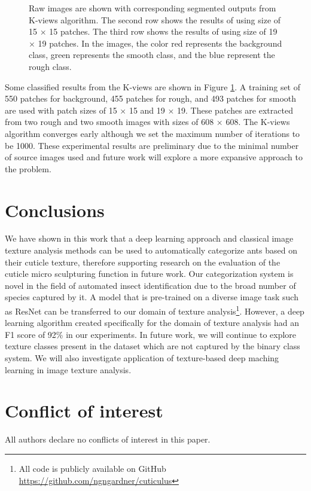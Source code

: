 \documentclass{aci}
\numberwithin{equation}{section}
\begin{document}
\begin{figure}
\begin{subfigure}{\segmentedsubwidth}
    \end{subfigure}
    \caption{Raw images are shown with corresponding segmented outputs from
        K-views algorithm. The second row shows the results of using size of 15
        $\times$ 15 patches. The third row shows the results of using size of 19
        $\times$ 19 patches. In the images, the color red represents the
        background class, green represents the smooth class, and the blue
        represent the rough class.}
    \label{fig:kviews_segmented}
\end{figure}

\FloatBarrier Some classified results from the K-views are shown in Figure
\ref{fig:kviews_segmented}. A training set of 550 patches for background, 455
patches for rough, and 493 patches for smooth are used with patch sizes of 15
$\times$ 15 and 19 $\times$ 19. These patches are extracted from two rough and
two smooth images with sizes of 608 $\times$ 608. The K-views algorithm
converges early although we set the maximum number of iterations to be 1000.
These experimental results are preliminary due to the minimal number of source
images used and future work will explore a more expansive approach to the
problem.

\section{Conclusions}
We have shown in this work that a deep learning approach and classical image
texture analysis methods can be used to automatically categorize ants based on
their cuticle texture, therefore supporting research on the evaluation of the
cuticle micro sculpturing function in future work. Our categorization system is
novel in the field of automated insect identification due to the broad number of
species captured by it. A model that is pre-trained on a diverse image task such
as ResNet can be transferred to our domain of texture analysis\footnote{All code
    is publicly available on GitHub \url{https://github.com/ngngardner/cuticulus}}.
However, a deep learning algorithm created specifically for the domain of
texture analysis had an F1 score of 92\% in our experiments. In future work, we
will continue to explore texture classes present in the dataset which are not
captured by the binary class system. We will also investigate application of
texture-based deep maching learning in image texture analysis.

\section*{Conflict of interest}
All authors declare no conflicts of interest in this paper.



\end{document}
